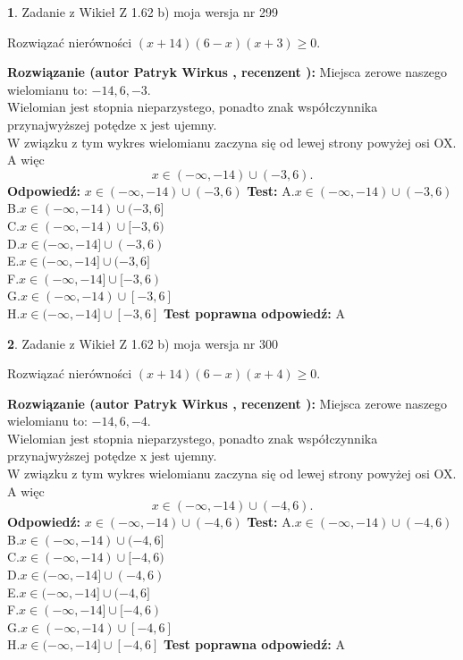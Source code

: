\documentclass[12pt, a4paper]{article}
\theoremstyle{definition} %
\newtheorem{zad}{}
\newcommand{\zadStart}[1]{\begin{zad}#1\newline}
\newcommand{\zadStop}{\end{zad}}
\newcommand{\rozwStart}[2]{\noindent \textbf{Rozwiązanie (autor #1 , recenzent #2): }\newline}
\newcommand{\rozwStop}{\newline}
\newcommand{\odpStart}{\noindent \textbf{Odpowiedź:}\newline}
\newcommand{\odpStop}{\newline}
\newcommand{\testStart}{\noindent \textbf{Test:}\newline}
\newcommand{\testStop}{\newline}
\newcommand{\kluczStart}{\noindent \textbf{Test poprawna odpowiedź:}\newline}
\newcommand{\kluczStop}{\newline}
\begin{document}
\zadStart{Zadanie z Wikieł Z 1.62 b) moja wersja nr 299}

Rozwiązać nierówności $(x+14)(6-x)(x+3)\ge0$.
\zadStop
\rozwStart{Patryk Wirkus}{}
Miejsca zerowe naszego wielomianu to: $-14, 6, -3$.\\
Wielomian jest stopnia nieparzystego, ponadto znak współczynnika przy\linebreak najwyższej potędze x jest ujemny.\\ W związku z tym wykres wielomianu zaczyna się od lewej strony powyżej osi OX. A więc $$x \in (-\infty,-14) \cup (-3,6).$$
\rozwStop
\odpStart
$x \in (-\infty,-14) \cup (-3,6)$
\odpStop
\testStart
A.$x \in (-\infty,-14) \cup (-3,6)$\\
B.$x \in (-\infty,-14) \cup (-3,6]$\\
C.$x \in (-\infty,-14) \cup [-3,6)$\\
D.$x \in (-\infty,-14] \cup (-3,6)$\\
E.$x \in (-\infty,-14] \cup (-3,6]$\\
F.$x \in (-\infty,-14] \cup [-3,6)$\\
G.$x \in (-\infty,-14) \cup [-3,6]$\\
H.$x \in (-\infty,-14] \cup [-3,6]$
\testStop
\kluczStart
A
\kluczStop



\zadStart{Zadanie z Wikieł Z 1.62 b) moja wersja nr 300}

Rozwiązać nierówności $(x+14)(6-x)(x+4)\ge0$.
\zadStop
\rozwStart{Patryk Wirkus}{}
Miejsca zerowe naszego wielomianu to: $-14, 6, -4$.\\
Wielomian jest stopnia nieparzystego, ponadto znak współczynnika przy\linebreak najwyższej potędze x jest ujemny.\\ W związku z tym wykres wielomianu zaczyna się od lewej strony powyżej osi OX. A więc $$x \in (-\infty,-14) \cup (-4,6).$$
\rozwStop
\odpStart
$x \in (-\infty,-14) \cup (-4,6)$
\odpStop
\testStart
A.$x \in (-\infty,-14) \cup (-4,6)$\\
B.$x \in (-\infty,-14) \cup (-4,6]$\\
C.$x \in (-\infty,-14) \cup [-4,6)$\\
D.$x \in (-\infty,-14] \cup (-4,6)$\\
E.$x \in (-\infty,-14] \cup (-4,6]$\\
F.$x \in (-\infty,-14] \cup [-4,6)$\\
G.$x \in (-\infty,-14) \cup [-4,6]$\\
H.$x \in (-\infty,-14] \cup [-4,6]$
\testStop
\kluczStart
A
\kluczStop
\end{document}
